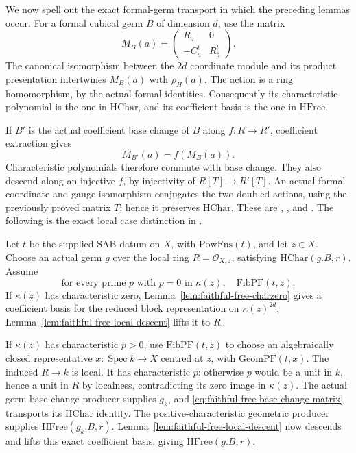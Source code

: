 We now spell out the exact formal-germ transport in which the
preceding lemmas occur.  For a formal cubical germ \(B\) of
dimension \(d\), use the matrix
\[
 M_B(a)=
 \begin{pmatrix}
 R_a&0\\
 -C_a^t&R_{\bar a}^t
 \end{pmatrix}.
 \tag{ST2}\label{eq:faithful-free-block-matrix}
\]
The canonical isomorphism between the \(2d\) coordinate module
and its product presentation intertwines \(M_B(a)\) with
\(\rho_H(a)\).  The action is a ring homomorphism, by the actual
formal identities.  Consequently its characteristic polynomial
is the one in \(\mathrm{HChar}\), and its coefficient basis is
the one in \(\mathrm{HFree}\).

If \(B'\) is the actual coefficient base change of \(B\) along
\(f:R\to R'\), coefficient extraction gives
\[
                         M_{B'}(a)=f(M_B(a)).
 \tag{ST3}\label{eq:faithful-free-base-change-matrix}
\]
Characteristic polynomials therefore commute with base change.
They also descend along an injective \(f\), by injectivity of
\(R[T]\to R'[T]\).
An actual formal coordinate and gauge isomorphism conjugates
the two doubled actions, using the previously proved matrix
\(T\); hence it preserves \(\mathrm{HChar}\).
These are , , and
.  The following is the exact local
case distinction in .

Let \(t\) be the supplied \(\mathrm{SAB}\) datum on \(X\), with
\(\mathrm{PowFns}(t)\), and let \(z\in X\).
Choose an actual germ \(g\) over the local ring
\(R=\mathcal O_{X,z}\), satisfying \(\mathrm{HChar}(g.B,r)\).
Assume
\[
 \text{for every prime }p\text{ with }p=0\text{ in }\kappa(z),
                         \quad \mathrm{FibPF}(t,z).
 \tag{ST4}\label{eq:faithful-free-stalk-fibpf}
\]
If \(\kappa(z)\) has characteristic zero,
Lemma~\ref{lem:faithful-free-charzero} gives a coefficient basis
for the reduced block representation on \(\kappa(z)^{2d}\);
Lemma~\ref{lem:faithful-free-local-descent} lifts it to \(R\).

If \(\kappa(z)\) has characteristic \(p>0\), use
\(\mathrm{FibPF}(t,z)\) to choose an algebraically closed
representative \(x:\operatorname{Spec}k\to X\) centred at \(z\),
with \(\mathrm{GeomPF}(t,x)\).
The induced \(R\to k\) is local.
It has characteristic \(p\): otherwise \(p\) would be a unit
in \(k\), hence a unit in \(R\) by localness, contradicting its
zero image in \(\kappa(z)\).
The actual germ-base-change producer supplies \(g_k\), and
\eqref{eq:faithful-free-base-change-matrix} transports its
\(\mathrm{HChar}\) identity.
The positive-characteristic geometric producer
 supplies
\(\mathrm{HFree}(g_k.B,r)\).
Lemma~\ref{lem:faithful-free-local-descent} now descends and lifts
this exact coefficient basis, giving
\(\mathrm{HFree}(g.B,r)\).

